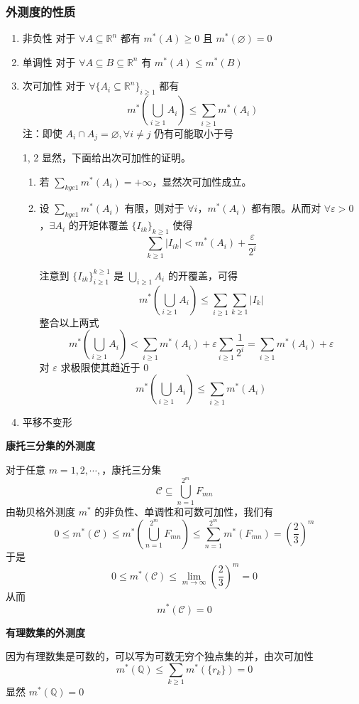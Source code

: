\documentclass{ctexbook}
\newcommand{\no}{\noindent}
\newcommand{\pro}{\no{\bf 证明：}}
\newcommand{\EXP}{\no {\bf 例}\quad}
\newcommand{\R}{\mathbb{R}}
\newcommand{\ITEMS}{\begin{enumerate}[leftmargin=4em]}
\newcommand{\ITEME}{\end{enumerate}}
\begin{document}
\subsubsection{外测度的性质}

\ITEMS
\item 非负性 \quad 对于 $\forall A \subseteq \R^n$ 都有 $m^*(A) \ge 0$ 且 $m^*(\varnothing) = 0$
\item 单调性 \quad 对于 $\forall A \subseteq B \subseteq \R^n$ 有 $m^*(A) \le m^*(B)$
\item 次可加性 \quad 对于 $\forall \{A_i\subseteq \R^n\}_{i\ge 1}$ 都有 
\[
m^*\left(\bigcup\limits_{i\ge 1} A_i\right) \le  \sum_{i \ge 1} m^*(A_i)
\]
注：即使 $A_i \cap A_j = \varnothing, \forall i \neq j$ 仍有可能取小于号

\pro 1, 2 显然，下面给出次可加性的证明。
\ITEMS
	\item 若 $\sum\limits_{k ge1} m^*(A_i)=+\infty$，显然次可加性成立。
	\item 设 $\sum\limits_{k ge1} m^*(A_i)$ 有限，则对于 $\forall i$，$m^*(A_i)$ 都有限。从而对 $\forall \varepsilon > 0$ ，$\exists A_i$ 的开矩体覆盖 $\{I_{ik}\}_{k\ge 1}$ 使得 
\[
\sum_{k\ge 1} \lvert I_{ik} \rvert < m^*(A_i) + \frac{\varepsilon}{2^i}
\] 

注意到 $\{I_{ik}\}_{i\ge 1}^{k\ge 1}$ 是 $\bigcup\limits_{i\ge1}A_i$ 的开覆盖，可得
\[
m^*\left(\bigcup_{i\ge1} A_i\right) \le \sum_{i\ge1}\sum_{k\ge1} \lvert I_k \rvert
\]
整合以上两式
\[
m^*\left(\bigcup_{i\ge1} A_i\right) < \sum_{i\ge1}m^*(A_i) + \varepsilon\sum_{i\ge1}\frac{1}{2^i}=\sum_{i\ge1}m^*(A_i) + \varepsilon
\]
对 $\varepsilon$ 求极限使其趋近于 $0$
\[
m^*\left(\bigcup_{i\ge1} A_i\right) \le \sum_{i\ge1}m^*(A_i)
\]
\ITEME
\item 平移不变形
\ITEME

\EXP 

{\bf 康托三分集的外测度}

对于任意 $m=1, 2, \cdots, $，康托三分集
\[
\mathcal{C} \subseteq \bigcup_{n=1}^{2^m} F_{mn}
\]
由勒贝格外测度 $m^*$ 的非负性、单调性和可数可加性，我们有
\[
0\le m^*(\mathcal{C}) \le m^*\left(\bigcup_{n=1}^{2^m} F_{mn}\right)\le \sum_{n=1}^{2^m}m^*\left( F_{mn}\right) =\left(\frac{2}{3}\right)^m
\]
于是
\[
0\le m^*(\mathcal{C}) \le \lim_{m \to \infty} \left(\frac{2}{3}\right)^m=0
\]
从而
\[
m^*(\mathcal{C}) = 0
\]

{\bf 有理数集的外测度}

因为有理数集是可数的，可以写为可数无穷个独点集的并，由次可加性
\[
m^*(\mathbb{Q}) \le \sum_{k\ge1}m^*(\{r_k\})=0 
\]
显然 $m^*(\mathbb{Q}) = 0$
\end{document}
